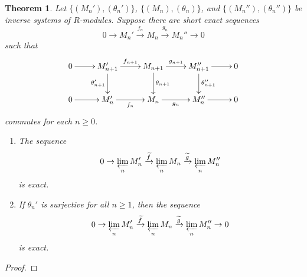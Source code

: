 \documentclass[11pt]{article}
\theoremstyle{thmstyle}
\newtheorem{theorem}{Theorem}[section]
\theoremstyle{defstyle}
\newcommand{\wt}[1]{\widetilde{#1}}
\renewcommand{\ge}{\geqslant}
\begin{document}
\begin{theorem}
    Let $\{(M_n'), (\theta_n')\}$, $\{(M_n), (\theta_n)\}$, and $\{(M_n''), (\theta_n'')\}$ be inverse systems of $R$-modules. Suppose there are short exact sequences 
    \begin{equation*}
        0\to M_n'\xrightarrow{f_n} M_n\xrightarrow{g_n} M_n''\to 0
    \end{equation*}
    such that 
    \begin{equation*}
        \xymatrix {
            0\ar[r] & M_{n + 1}'\ar[r]^-{f_{n + 1}}\ar[d]_{\theta_{n + 1}'} & M_{n + 1}\ar[r]^-{g_{n + 1}}\ar[d]^{\theta_{n + 1}} & M_{n + 1}''\ar[r]\ar[d]^{\theta_{n + 1}''} & 0\\
            0\ar[r] & M_{n}'\ar[r]_-{f_n} & M_{n}\ar[r]_-{g_n} & M_{n}''\ar[r] & 0
        }
    \end{equation*}
    commutes for each $n\ge 0$.
    \begin{enumerate}[label=(\arabic*)]
        \item The sequence 
        \begin{equation*}
            0\to\varprojlim_n M_n'\xrightarrow{\wt f}\varprojlim_n M_n\xrightarrow{\wt g}\varprojlim_n M_n''
        \end{equation*}
        is exact.
        \item If $\theta_n'$ is surjective for all $n\ge 1$, then the sequence 
        \begin{equation*}
            0\to\varprojlim_n M_n'\xrightarrow{\wt f}\varprojlim_n M_n\xrightarrow{\wt g}\varprojlim_n M_n''\to 0
        \end{equation*}
        is exact.
    \end{enumerate}
\end{theorem}
\begin{proof}
\end{proof}
\end{document}
